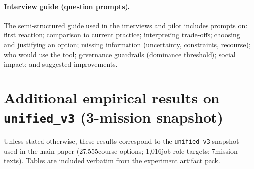 \documentclass{article}
\newcommand{\NumCourses}{27,555}             %
\newcommand{\NumOccupations}{1,016}          %
\newcommand{\NumMissionsMain}{7}             %
\begin{document}
\paragraph{Interview guide (question prompts).} The semi-structured guide used in the interviews and pilot includes prompts on: first reaction; comparison to current practice; interpreting trade-offs; choosing and justifying an option; missing information (uncertainty, constraints, recourse); who would use the tool; governance guardrails (dominance threshold); social impact; and suggested improvements.

\section{Additional empirical results on \texttt{unified\_v3} (3-mission snapshot)}
\label{sec:supp-results}
Unless stated otherwise, these results correspond to the \texttt{unified\_v3} snapshot used in the main paper (\NumCourses course options; \NumOccupations job-role targets; \NumMissionsMain mission texts). Tables are included verbatim from the experiment artifact pack.
\end{document}
